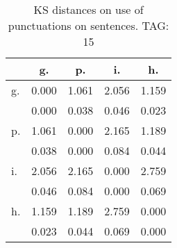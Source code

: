 \begin{table}[h!]
\begin{center}
\begin{tabular}{| l | c | c | c | c |}\hline
 & g. & p. & i. & h. \\\hline
g. & 0.000  & 1.061  & 2.056  & 1.159 \\\hline
 & 0.000  & 0.038  & 0.046  & 0.023 \\\hline
p. & 1.061  & 0.000  & 2.165  & 1.189 \\\hline
 & 0.038  & 0.000  & 0.084  & 0.044 \\\hline
i. & 2.056  & 2.165  & 0.000  & 2.759 \\\hline
 & 0.046  & 0.084  & 0.000  & 0.069 \\\hline
h. & 1.159  & 1.189  & 2.759  & 0.000 \\\hline
 & 0.023  & 0.044  & 0.069  & 0.000 \\\hline
\end{tabular}
\caption{KS distances on use of punctuations on sentences. TAG: 15}
\end{center}
\end{table}
